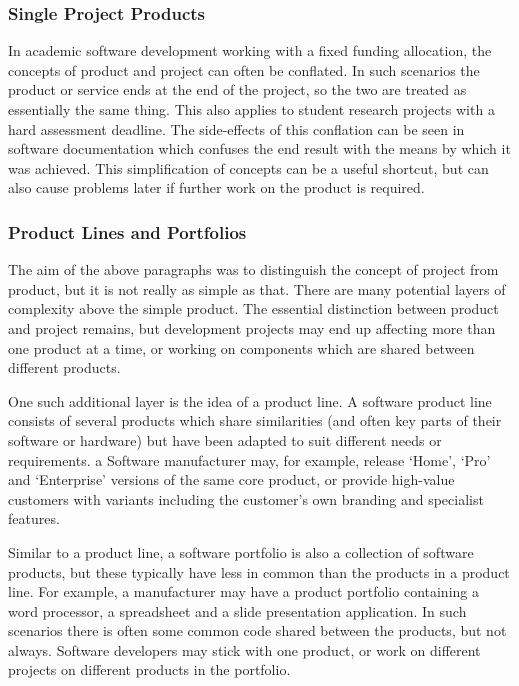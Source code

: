 \subsubsection{Single Project Products}

In academic software development working with a fixed funding allocation, the concepts of product and project can often be conflated. In such scenarios the product or service ends at the end of the project, so the two are treated as essentially the same thing. This also applies to student research projects with a hard assessment deadline. The side-effects of this conflation can be seen in software documentation which confuses the end result with the means by which it was achieved. This simplification of concepts can be a useful shortcut, but can also cause problems later if further work on the product is required.

\subsubsection{Product Lines and Portfolios}

The aim of the above paragraphs was to distinguish the concept of project from product, but it is not really as simple as that. There are many potential layers of complexity above the simple product. The essential distinction between product and project remains, but development projects may end up affecting more than one product at a time, or working on components which are shared between different products.

One such additional layer is the idea of a product line. A software product line consists of several products which share similarities (and often key parts of their software or hardware) but have been adapted to suit different needs or requirements. a Software manufacturer may, for example, release `Home', `Pro' and `Enterprise' versions of the same core product, or provide high-value customers with variants including the customer's own branding and specialist features.

Similar to a product line, a software portfolio is also a collection of software products, but these typically have less in common than the products in a product line. For example, a manufacturer may have a product portfolio containing a word processor, a spreadsheet and a slide presentation application. In such scenarios there is often some common code shared between the products, but not always. Software developers may stick with one product, or work on different projects on different products in the portfolio.

